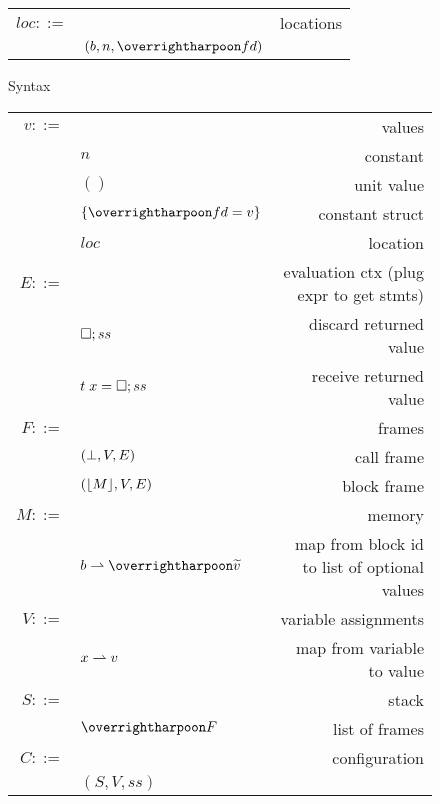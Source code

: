 \begin{figure}[!htbp]
\begin{center}
\begin{tabularx}{\columnwidth}{rlR}
    $loc ::= $ & & locations \\
    & $(b, n, \ls{fd})$ &  \\

  \end{tabularx}
\end{center}
\caption{\cstar Syntax}
\label{fig:cstar-syntax}
\end{figure}


\begin{figure}[!htbp]
\begin{small}
\begin{center}
  \begin{tabularx}{\columnwidth}{rlR}

    $v ::= $ & & values \\
    & $n$    & constant \\
    & $()$ & unit value \\
    & $\{\ls{fd=v}\}$ & constant struct \\
    & $loc$                        & location \\
    [1.2mm]

    $E ::=$ & & evaluation ctx (plug expr to get stmts) \\
    & $\Box; ss$ & discard returned value \\
    & $t\;x=\Box; ss$ & receive returned value \\
    [1.2mm]

    $F ::=$ & & frames \\
    & $(\bot, V, E)$ & call frame \\
    & $(\lfloor M \rfloor, V, E)$ & block frame \\
    [1.2mm]

    $M ::=$ & & memory \\
    & $b\sympartial \ls{\option{v}}$ & map from block id to list of optional values \\
    [1.2mm]

    $V ::=$ & & variable assignments \\
    & $x\rightharpoonup v$ & map from variable to value \\
    [1.2mm]

    $S ::=$ & & stack \\
    & $\ls{F}$ & list of frames \\
    [1.2mm]

    $C ::=$ & & configuration \\
    & $(S, V, ss)$ &  \\
    [1.2mm]


\end{tabularx}
\end{center}
\end{small}
\end{figure}
